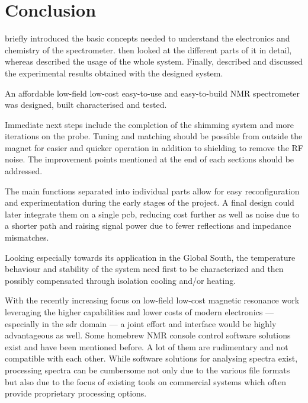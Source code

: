 \chapter{Conclusion}

 briefly introduced the basic concepts needed to understand the electronics and chemistry of the spectrometer.  then looked at the different parts of it in detail, whereas  described the usage of the whole system. Finally,  described and discussed the experimental results obtained with the designed system.

An affordable low-field low-cost easy-to-use and easy-to-build NMR spectrometer was designed, built characterised and tested.

Immediate next steps include the completion of the shimming system and more iterations on the probe. Tuning and matching should be possible from outside the magnet for easier and quicker operation in addition to shielding to remove the RF noise. The improvement points mentioned at the end of each sections should be addressed.

The main functions separated into individual parts allow for easy reconfiguration and experimentation during the early stages of the project. A final design could later integrate them on a single \acrshort{pcb}, reducing cost further as well as noise due to a shorter path and raising signal power due to fewer reflections and impedance mismatches.

Looking especially towards its application in the Global South, the temperature behaviour and stability of the system need first to be characterized and then possibly compensated through isolation cooling and/or heating.

With the recently increasing focus on low-field low-cost magnetic resonance work leveraging the higher capabilities and lower costs of modern electronics --- especially in the \acrshort{sdr} domain --- a joint effort and interface would be highly advantageous as well. Some homebrew NMR console control software solutions exist and have been mentioned before. A lot of them are rudimentary and not compatible with each other. While software solutions for analysing spectra exist, processing spectra can be cumbersome not only due to the various file formats but also due to the focus of existing tools on commercial systems which often provide proprietary processing options.

